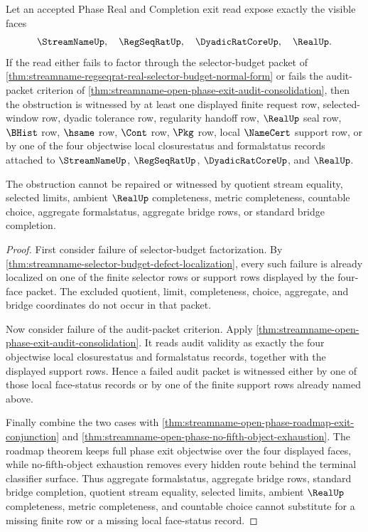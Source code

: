\begin{theorem}
\label{thm:streamname-selector-budget-defect-face-status-obstruction}
Let an accepted Phase Real and Completion exit read expose exactly the visible faces
$$
\StreamNameUp,\quad \RegSeqRatUp,\quad \DyadicRatCoreUp,\quad \RealUp.
$$
If the read either fails to factor through the selector-budget packet of \autoref{thm:streamname-regseqrat-real-selector-budget-normal-form} or fails the audit-packet criterion of \autoref{thm:streamname-open-phase-exit-audit-consolidation}, then the obstruction is witnessed by at least one displayed finite request row, selected-window row, dyadic tolerance row, regularity handoff row, $\RealUp$ seal row, $\BHist$ row, $\hsame$ row, $\Cont$ row, $\Pkg$ row, local $\NameCert$ support row, or by one of the four objectwise local closurestatus and formalstatus records attached to $\StreamNameUp$, $\RegSeqRatUp$, $\DyadicRatCoreUp$, and $\RealUp$.

The obstruction cannot be repaired or witnessed by quotient stream equality, selected limits, ambient $\RealUp$ completeness, metric completeness, countable choice, aggregate formalstatus, aggregate bridge rows, or standard bridge completion.
\end{theorem}
\begin{proof}
First consider failure of selector-budget factorization. By \autoref{thm:streamname-selector-budget-defect-localization}, every such failure is already localized on one of the finite selector rows or support rows displayed by the four-face packet. The excluded quotient, limit, completeness, choice, aggregate, and bridge coordinates do not occur in that packet.

Now consider failure of the audit-packet criterion. Apply \autoref{thm:streamname-open-phase-exit-audit-consolidation}. It reads audit validity as exactly the four objectwise local closurestatus and formalstatus records, together with the displayed support rows. Hence a failed audit packet is witnessed either by one of those local face-status records or by one of the finite support rows already named above.

Finally combine the two cases with \autoref{thm:streamname-open-phase-roadmap-exit-conjunction} and \autoref{thm:streamname-open-phase-no-fifth-object-exhaustion}. The roadmap theorem keeps full phase exit objectwise over the four displayed faces, while no-fifth-object exhaustion removes every hidden route behind the terminal classifier surface. Thus aggregate formalstatus, aggregate bridge rows, standard bridge completion, quotient stream equality, selected limits, ambient $\RealUp$ completeness, metric completeness, and countable choice cannot substitute for a missing finite row or a missing local face-status record.
\end{proof}

